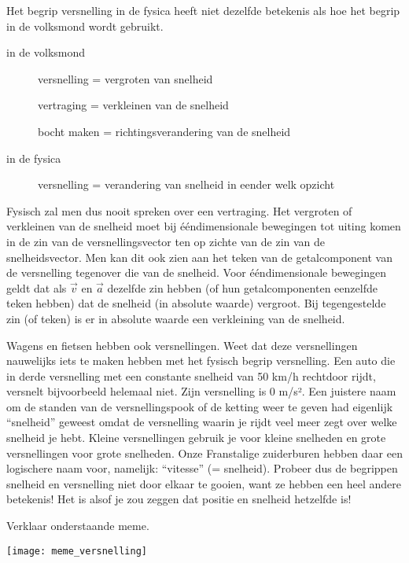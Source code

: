 \documentclass{ximera}
\begin{document}
\begin{remark}
	Het begrip versnelling in de fysica heeft niet dezelfde betekenis als hoe het begrip in de volksmond wordt gebruikt.
	\begin{description}
		\item[in de volksmond] 
			\begin{itemize}
				versnelling = vergroten van snelheid

				vertraging = verkleinen van de snelheid

				bocht maken = richtingsverandering van de snelheid
			\end{itemize}
		\item[in de fysica]
			versnelling = verandering van snelheid in eender welk opzicht
	\end{description}

	Fysisch zal men dus nooit spreken over een vertraging. Het vergroten of verkleinen van de snelheid moet bij ééndimensionale bewegingen tot uiting komen in de zin van de versnellingsvector ten op zichte van de zin van de snelheidsvector. Men kan dit ook zien aan het teken van de getalcomponent van de versnelling tegenover die van de snelheid.
	Voor ééndimensionale bewegingen geldt dat als \(\vec{v}\) en \(\vec{a}\) dezelfde zin hebben (of hun getalcomponenten eenzelfde teken hebben) dat de snelheid (in absolute waarde) vergroot. Bij tegengestelde zin (of teken) is er in absolute waarde een verkleining van de snelheid.

\end{remark}

\begin{remark}

	Wagens en fietsen hebben ook versnellingen. 
	Weet dat deze versnellingen nauwelijks iets te maken hebben met het fysisch begrip versnelling. 
	Een auto die in derde versnelling met een constante snelheid van 50 km/h rechtdoor rijdt, versnelt bijvoorbeeld helemaal niet. 
	Zijn versnelling is 0 m/s². 
	Een juistere naam om de standen van de versnellingspook of de ketting weer te geven had eigenlijk “snelheid” geweest omdat de versnelling waarin je rijdt veel meer zegt over welke snelheid je hebt. 
	Kleine versnellingen gebruik je voor kleine snelheden en grote versnellingen voor grote snelheden. 
	Onze Franstalige zuiderburen hebben daar een logischere naam voor, namelijk: “vitesse” (= snelheid). 
	Probeer dus de begrippen snelheid en versnelling niet door elkaar te gooien, want ze hebben een heel andere betekenis! 
	Het is alsof je zou zeggen dat positie en snelheid hetzelfde is!


\end{remark}

\begin{exercise}
Verklaar onderstaande meme. 

\begin{image}
\texttt{[image: meme\_versnelling]}
\end{image}

\end{exercise}
	
\end{document}
